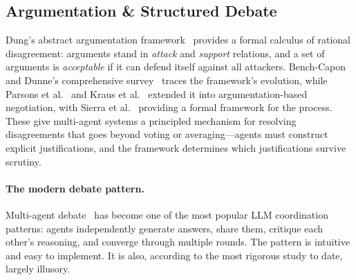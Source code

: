 \documentclass{article}
\begin{document}
\subsection{Argumentation \& Structured Debate}
\label{sec:p-argue}

%
%
%
%
%
%

Dung's abstract argumentation framework~\citep{dung1995acceptability,
sutra10607_acceptability1995} provides a formal calculus of rational disagreement:
arguments stand in \emph{attack} and \emph{support} relations, and a set of arguments
is \emph{acceptable} if it can defend itself against all attackers. Bench-Capon and
Dunne's comprehensive survey~\citep{sutra889_argumentation2012} traces the
framework's evolution, while Parsons et al.~\citep{sutra3738_agents1998} and Kraus
et al.~\citep{sutra212_reaching1998} extended it into argumentation-based
negotiation, with Sierra et al.~\citep{sutra386_framework1998} providing a formal
framework for the process. These give multi-agent systems a principled mechanism for
resolving disagreements that goes beyond voting or averaging---agents must construct
explicit justifications, and the framework determines which justifications survive
scrutiny.

\paragraph{The modern debate pattern.}
Multi-agent debate~\citep{du2023debate} has become one of the most popular LLM
coordination patterns: agents independently generate answers, share them, critique
each other's reasoning, and converge through multiple rounds. The pattern is intuitive
and easy to implement. It is also, according to the most rigorous study to date,
largely illusory.
\end{document}
